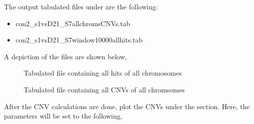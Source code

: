 \documentclass[letterpaper,10pt,english]{sphinxhowto}
\begin{document}
\sphinxAtStartPar
The output tabulated files under  are the following:
\begin{itemize}
\item {} 
\sphinxAtStartPar
con\sphinxhyphen{}2\_s1\sphinxhyphen{}vs\sphinxhyphen{}D2\sphinxhyphen{}1\_S7\sphinxhyphen{}all\sphinxhyphen{}chroms\sphinxhyphen{}CNVs.tab

\item {} 
\sphinxAtStartPar
con\sphinxhyphen{}2\_s1\sphinxhyphen{}vs\sphinxhyphen{}D2\sphinxhyphen{}1\_S7\sphinxhyphen{}window\sphinxhyphen{}10000\sphinxhyphen{}all\sphinxhyphen{}hits.tab

\end{itemize}

\sphinxAtStartPar
A depiction of the files are shown below,

\begin{figure}[htbp]
\centering
\capstart

\noindent{}
\caption{Tabulated file containing all hits of all chromosomes}\label{\detokenize{index:id1}}\end{figure}

\begin{figure}[htbp]
\centering
\capstart

\noindent{}
\caption{Tabulated file containing all CNVs of all chromsomes}\label{\detokenize{index:id2}}\end{figure}

\sphinxAtStartPar
After the CNV calculations are done, plot the CNVs under the  section. Here, the parameters will be set to the following,

\begin{sphinxVerbatim}[commandchars=\\\{\}]
 \PYG{p}{[} \PYG{p}{]}    
\end{sphinxVerbatim}
\end{document}
